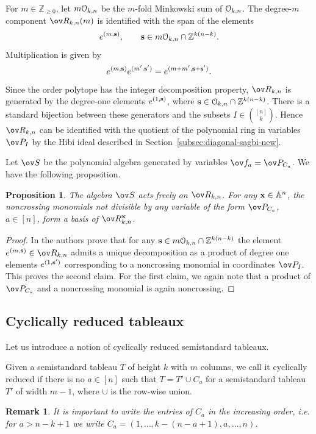 \documentclass[11pt]{amsart}
\numberwithin{equation}{section}
\newtheorem{prop}[thm]{Proposition}
\newtheorem{rem}[thm]{Remark}
\newcommand{\bZ}{{\mathbb Z}}
\newcommand{\bA}{{\mathbb A}}
\newcommand{\eO}{\EuScript{O}}
\newcommand{\bfx}{{\bf x}}
\newcommand{\bfs}{{\bf s}}
\begin{document}
For $m\in\bZ_{\ge0}$, let $m\eO_{k,n}$
be the $m$-fold Minkowski sum of
$\eO_{k,n}$. The degree-$m$ component
$\ov R_{k,n}(m)$ is identified with
the span of the elements
\[
e^{(m,\bfs)},\qquad
\bfs\in m\eO_{k,n}\cap\bZ^{k(n-k)}.
\]
Multiplication is given by
\[
e^{(m,\bfs)}e^{(m',\bfs')}
=e^{(m+m',\bfs+\bfs')}.
\]
Since the order polytope has the integer
decomposition property, $\ov R_{k,n}$
is generated by the degree-one elements
$e^{(1,\bfs)}$, where
$\bfs\in\eO_{k,n}\cap\bZ^{k(n-k)}$.
There is a standard bijection between
these generators and the subsets
$I\in\binom{[n]}{k}$.
Hence $\ov R_{k,n}$ can be identified
with the quotient of the polynomial ring
in variables $\ov P_I$ by the Hibi ideal
described in
Section~\ref{subsec:diagonal-sagbi-new}.


Let $\ov S$ be the polynomial algebra generated by variables $\ov f_a = \ov P_{C_a}$.
We have the following proposition.

\begin{prop}
The algebra $\ov S$ acts freely on $\ov R_{k,n}$.     
For any $\bfx\in\bA^n$, the noncrossing monomials not divisible by any variable of the 
form $\ov P_{C_a}$, $a\in [n]$, form a basis of $\ov R^\bfx_{k,n}$.
\end{prop}
 
\begin{proof}
In \cite{PPS10} the authors prove that for any $\bfs\in m\eO_{k,n}\cap \bZ^{k(n-k)}$
the element $e^{(m,\bfs)}\in \ov R_{k,n}$ admits a unique decomposition
as a product of degree one elements $e^{(1,\bfs')}$ corresponding to a noncrossing
monomial in coordinates $\ov P_I$. This proves the second claim. For the first
claim, we again note that a product of $\ov P_{C_a}$ and a noncrossing monomial
is again noncrossing.
\end{proof} 

\subsection{Cyclically reduced tableaux}
Let us introduce a notion of cyclically reduced semistandard tableaux. 

Given a semistandard tableau $T$ of height $k$ with $m$ columns, we call
it cyclically reduced if there is no $a\in [n]$ such that 
$T=T'\cup C_a$
for a semistandard tableau $T'$ of width $m-1$, where $\cup$ is the row-wise union.

\begin{rem}
It is important to write the entries of $C_a$ in the increasing order, i.e.
for $a>n-k+1$ we write $C_a = (1,\dots, k-(n-a+1),a,\dots,n)$. 
\end{rem}
\end{document}
